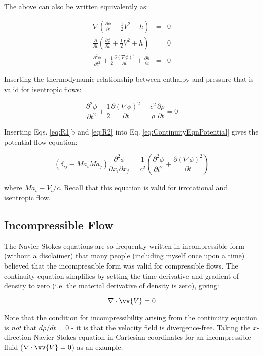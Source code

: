 \documentclass[10pt]{article}
\newcommand{\beq}{\begin{equation}}
\newcommand{\eeq}{\end{equation}}
\begin{document}
\begin{flushleft}
The above can also be written equivalently as:

\begin{subequations}
\begin{eqnarray}
\nabla\left(\frac{\partial\phi}{\partial t}+\frac{1}{2}V^2+h\right)&=&0\\
\frac{\partial}{\partial t}\left(\frac{\partial\phi}{\partial t}+\frac{1}{2}V^2+h\right)&=&0\\
\frac{\partial^2\phi}{\partial t^2}+\frac{1}{2}\frac{\partial (\nabla\phi)^2}{\partial t}+\frac{\partial h}{\partial t}&=&0
\end{eqnarray}
\end{subequations}

Inserting the thermodynamic relationship between enthalpy and pressure that is valid for isentropic flows:

\beq
\label{eq:R2}
\frac{\partial^2\phi}{\partial t^2}+\frac{1}{2}\frac{\partial (\nabla\phi)^2}{\partial t}+\frac{c^2}{\rho}\frac{\partial\rho}{\partial t}=0
\eeq

Inserting Eqs. \eqref{eq:R1}b and \eqref{eq:R2} into Eq. \eqref{eq:ContinuityEqnPotential} gives the potential flow equation:

\beq
\label{eq:PotentialFlowModel}
\left(\delta_{ij}-Ma_iMa_j\right)\frac{\partial^2\phi}{\partial x_i\partial x_j}=\frac{1}{c^2}\left(\frac{\partial^2\phi}{\partial t^2}+\frac{\partial(\nabla\phi)^2}{\partial t}\right)
\eeq

where \(Ma_i\equiv V_i/c\). Recall that this equation is valid for irrotational and isentropic flow.

\subsection{Incompressible Flow}

The Navier-Stokes equations are so frequently written in incompressible form (without a disclaimer) that many people (including myself once upon a time) believed that the incompressible form was valid for compressible flows. The continuity equation simplifies by setting the time derivative and gradient of density to zero (i.e. the material derivative of density is zero), giving:

\beq
\nabla\cdot\vv{V}=0
\eeq

Note that the condition for incompressibility arising from the continuity equation is {\it not} that \(d\rho/dt=0\) - it is that the velocity field is divergence-free. Taking the \(x\)-direction Navier-Stokes equation in Cartesian coordinates for an incompressible fluid (\(\nabla\cdot\vv{V}=0\)) as an example:


\end{flushleft}
\end{document}
